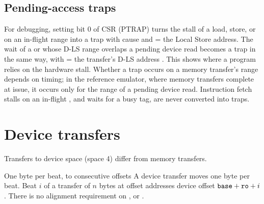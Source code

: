 \subsection{Pending-access traps}
For debugging, setting bit 0 of CSR  (PTRAP) turns the stall of a load, store,  or
 on an in-flight range into a trap with cause  and  = the Local
Store address. The wait of a  or  whose D-LS range overlaps a pending device read
becomes a  trap in the same way, with  = the transfer's D-LS address . This
shows where a program relies on the hardware stall. Whether a  trap occurs on a memory
transfer's range depends on timing; in the reference emulator, where memory transfers complete at
issue, it occurs only for the range of a pending device read. Instruction fetch stalls on an in-flight
, and waits for a busy tag, are never converted into traps.

\section{Device transfers}\label{sec:devxfer}

Transfers to device space (space 4) differ from memory transfers.

\begin{rule*}{One byte per beat, to consecutive offsets}
A device transfer moves one byte per beat. Beat $i$ of a transfer of $n$ bytes at offset 
addresses device offset $\texttt{base} + \texttt{ro} + i$. There is no alignment requirement on ,
 or .
\end{rule*}

